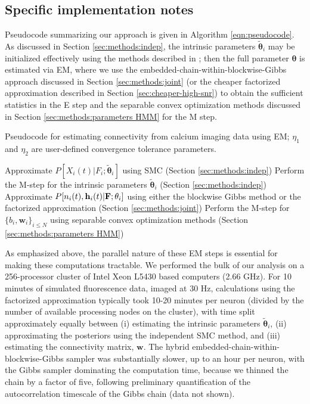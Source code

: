 \documentclass[aoas,preprint]{imsart}
\newcommand{\bth}{\mathbf{\theta}}
\newcommand{\w}{w}
\newcommand{\bw}{\mathbf{\w}}
\newcommand{\bF}{{\bf F}}
\newcommand{\bh}{\mathbf{h}}
\newcommand{\tbth}{\tilde{\bth}}
\begin{document}
\subsection{Specific implementation notes} \label{sec:methods:specific_implementation}

Pseudocode summarizing our approach is given in Algorithm \ref{eqn:pseudocode}. As discussed in Section \ref{sec:methods:indep}, the intrinsic parameters $\tbth_i$ may be initialized effectively using the methods described in \cite{Vogelstein2009}; then the full parameter $\bth$ is estimated via EM, where we use the embedded-chain-within-blockwise-Gibbs approach discussed in Section \ref{sec:methods:joint} (or the cheaper factorized approximation described in Section \ref{sec:cheaper-high-snr}) to obtain the sufficient statistics in the E step and the separable convex optimization methods discussed in Section \ref{sec:methods:parameters HMM} for the M step.

\begin{algorithm}[t!]
\caption{Pseudocode for estimating connectivity from
calcium imaging data using EM; $\eta_1$ and $\eta_2$ are
user-defined convergence tolerance parameters.}
\label{eqn:pseudocode}
\begin{algorithmic}
\While{$|{\bw}^{(l)}-{\bw}^{(l-1)}|>\eta_1$}
    \While{$|{\tbth_i}^{(l)}-{\tbth_i}^{(l-1)}|> \eta_2$}
      \State Approximate $P[X_i(t)|F_i; \tbth_i]$ using SMC (Section \ref{sec:methods:indep})
      \State Perform the M-step for the intrinsic parameters $\tbth_i$ (Section \ref{sec:methods:indep})
    \EndWhile
  \EndFor
      \State Approximate $P[n_i(t), \bh_i(t) |\bF; \bth_i]$ using either the blockwise Gibbs
      \State method or the factorized approximation (Section \ref{sec:methods:joint})
    \EndFor
  	\State Perform the M-step for $\{b_i, \bw_i\}_{i\leq N}$ using separable convex optimization methods (Section \ref{sec:methods:parameters HMM})
  \EndFor
\EndWhile
\end{algorithmic}
\end{algorithm}

As emphasized above, the parallel nature of these EM steps is
essential for making these computations tractable. We performed the
bulk of our analysis on a 256-processor cluster of Intel Xeon L5430
based computers (2.66 GHz). For 10 minutes of simulated fluorescence
data, imaged at $30$ Hz, calculations using the factorized
approximation typically took 10-20 minutes per neuron (divided by the
number of available processing nodes on the cluster), with time split
approximately equally between (i) estimating the intrinsic parameters
$\tbth_i $, (ii) approximating the posteriors using the independent
SMC method, and (iii) estimating the connectivity matrix,
$\bw$. The hybrid embedded-chain-within-blockwise-Gibbs sampler was
substantially slower, up to an hour per neuron, with the Gibbs sampler
dominating the computation time, because we thinned the chain by a
factor of five, following preliminary quantification of the
autocorrelation timescale of the Gibbs chain (data not shown).
\end{document}
